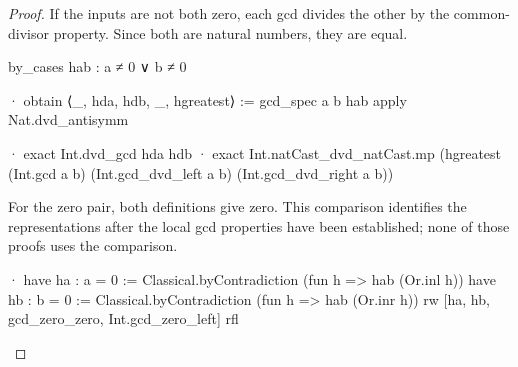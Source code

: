 \begin{proof}
  If the inputs are not both zero, each gcd divides the other by the common-divisor property. Since both are natural numbers, they are equal.

  \begin{lean}
    by_cases hab : a ≠ 0 ∨ b ≠ 0

    · obtain ⟨_, hda, hdb, _, hgreatest⟩ := gcd_spec a b hab
      apply Nat.dvd_antisymm

      · exact Int.dvd_gcd hda hdb
      · exact Int.natCast_dvd_natCast.mp
          (hgreatest (Int.gcd a b) (Int.gcd_dvd_left a b) (Int.gcd_dvd_right a b))
  \end{lean}

  For the zero pair, both definitions give zero. This comparison identifies the representations after the local gcd properties have been established; none of those proofs uses the comparison.

  \begin{lean}
    · have ha : a = 0 := Classical.byContradiction (fun h => hab (Or.inl h))
      have hb : b = 0 := Classical.byContradiction (fun h => hab (Or.inr h))
      rw [ha, hb, gcd_zero_zero, Int.gcd_zero_left]
      rfl
  \end{lean}

\end{proof}
